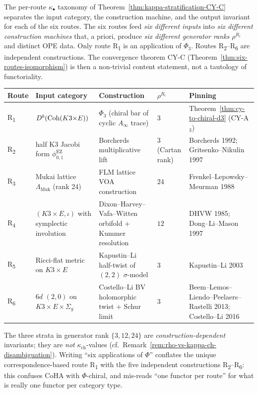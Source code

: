 \begin{remark}[Six routes = six different constructions, not six applications of \texorpdfstring{$\Phi$}{Phi}]
\label{rem:cy-c-six-routes-different-constructions}
The per-route $\kappa_\bullet$ taxonomy of Theorem~\ref{thm:kappa-stratification-CY-C} separates the input category, the construction machine, and the output invariant for each of the six routes. The six routes feed \emph{six different inputs} into \emph{six different construction machines} that, a priori, produce \emph{six different generator ranks $\rho^{R_i}$} and distinct OPE data. Only route R\textsubscript{1} is an application of $\Phi_3$. Routes R\textsubscript{2}--R\textsubscript{6} are independent constructions. The convergence theorem CY-C (Theorem~\ref{thm:six-routes-isomorphism}) is then a non-trivial content statement, not a tautology of functoriality.
\begin{center}
\small
\renewcommand{\arraystretch}{1.25}
\begin{tabular}{lllll}
\toprule
\textbf{Route} & \textbf{Input category} & \textbf{Construction} & \textbf{$\rho^{R_i}$} & \textbf{Pinning} \\
\midrule
R\textsubscript{1} & $D^b(\mathrm{Coh}(K3{\times}E))$ & $\Phi_3$ (chiral bar of cyclic $A_\infty$ trace) & $3$ & Theorem~\ref{thm:cy-to-chiral-d3} (CY-A$_3$) \\
R\textsubscript{2} & half K3 Jacobi form $\phi_{0,1}^{\mathrm{EZ}}$ & Borcherds multiplicative lift & $3$ (Cartan rank) & Borcherds 1992; Gritsenko--Nikulin 1997 \\
R\textsubscript{3} & Mukai lattice $\Lambda_{\mathrm{Muk}}$ (rank 24) & FLM lattice VOA construction & $24$ & Frenkel--Lepowsky--Meurman 1988 \\
R\textsubscript{4} & $(K3{\times}E,\iota)$ with symplectic involution & Dixon--Harvey--Vafa--Witten orbifold + Kummer resolution & $12$ & DHVW 1985; Dong--Li--Mason 1997 \\
R\textsubscript{5} & Ricci-flat metric on $K3 \times E$ & Kapustin--Li half-twist of $(2,2)$ $\sigma$-model & $3$ & Kapustin--Li 2003 \\
R\textsubscript{6} & $6d$ $(2,0)$ on $K3{\times}E \times \Sigma_g$ & Costello--Li BV holomorphic twist + Schur limit & $3$ & Beem--Lemos--Liendo--Peelaers--Rastelli 2013; Costello--Li 2016 \\
\bottomrule
\end{tabular}
\end{center}
The three strata in generator rank $\{3, 12, 24\}$ are \emph{construction-dependent} invariants; they are \emph{not} $\kappa_{\mathrm{ch}}$-values (cf.\ Remark~\ref{rem:rho-vs-kappa-ch-disambiguation}). Writing ``six applications of $\Phi$'' conflates the unique correspondence-based route R\textsubscript{1} with the five independent constructions R\textsubscript{2}--R\textsubscript{6}: this confuses CoHA with $\Phi$-chiral, and mis-reads ``one functor per route'' for what is really one functor per category type.
\end{remark}

